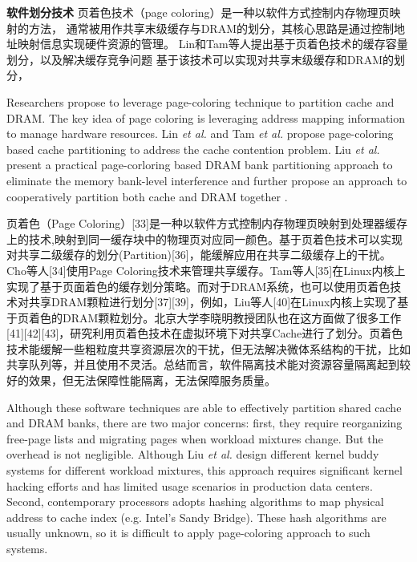 \textbf{软件划分技术} 页着色技术（page coloring）是一种以软件方式控制内存物理页映射的方法，
通常被用作共享末级缓存与DRAM的划分，其核心思路是通过控制地址映射信息实现硬件资源的管理。
Lin和Tam等人提出基于页着色技术的缓存容量划分，以及解决缓存竞争问题
基于该技术可以实现对共享末级缓存和DRAM的划分，

Researchers propose to leverage
page-coloring technique to partition cache and DRAM.
The key idea of page coloring is leveraging address mapping information to manage hardware
resources.
Lin \emph{et al.} \cite{lin_gaining_2008}
and Tam \emph{et al.} \cite{tam_managing_2007} propose page-coloring based cache
partitioning to address the cache contention problem.
Liu \emph{et al.} \cite{liu_software_2012} present a practical page-corloring
based DRAM bank partitioning approach to eliminate the memory bank-level
interference and further propose an approach to cooperatively partition
both cache and DRAM together \cite{Liu:2014:ISCA}.

页着色（Page Coloring）[33]是一种以软件方式控制内存物理页映射到处理器缓存上的技术,映射到同一缓存块中的物理页对应同一颜色。基于页着色技术可以实现对共享二级缓存的划分(Partition)[36]，能缓解应用在共享二级缓存上的干扰。Cho等人[34]使用Page Coloring技术来管理共享缓存。Tam等人[35]在Linux内核上实现了基于页面着色的缓存划分策略。而对于DRAM系统，也可以使用页着色技术对共享DRAM颗粒进行划分[37][39]，例如，Liu等人[40]在Linux内核上实现了基于页着色的DRAM颗粒划分。北京大学李晓明教授团队也在这方面做了很多工作[41][42][43]，研究利用页着色技术在虚拟环境下对共享Cache进行了划分。页着色技术能缓解一些粗粒度共享资源层次的干扰，但无法解决微体系结构的干扰，比如共享队列等，并且使用不灵活。总结而言，软件隔离技术能对资源容量隔离起到较好的效果，但无法保障性能隔离，无法保障服务质量。

Although these software techniques
are able to effectively partition shared cache and DRAM banks, there are two major
concerns: first, they require reorganizing free-page lists and migrating pages
when workload mixtures change. But the overhead is not negligible. 
Although Liu \emph{et al.} \cite{Liu:2014:ISCA}
design different kernel buddy systems for different workload mixtures,
this approach requires significant kernel hacking efforts and has limited usage
scenarios in production data centers. Second, contemporary processors 
adopts hashing algorithms to map 
physical address to cache index (e.g. Intel's Sandy Bridge). These hash algorithms are 
usually unknown, so it is difficult to apply page-coloring
approach to such systems.

